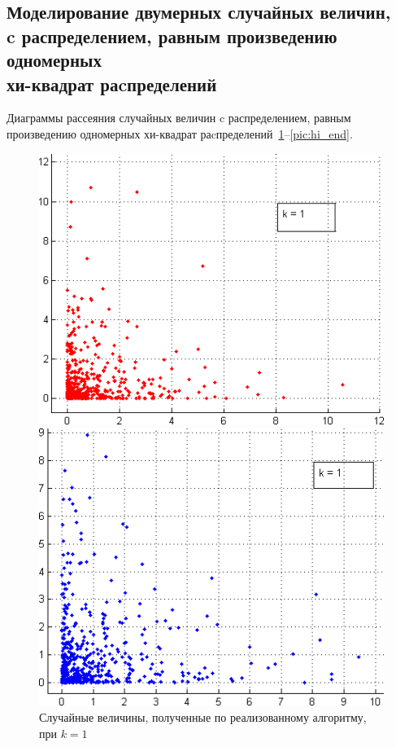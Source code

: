 \newpage 

\subsection{Моделирование двумерных случайных величин, \\ 
  c распределением, равным произведению одномерных \\
  хи-квадрат раcпределений}

Диаграммы рассеяния случайных величин c распределением, 
равным произведению одномерных хи-квадрат раcпределений~\ref{pic:hi_start}--\ref{pic:hi_end}.

\begin{figure}[h!]
  \begin{minipage}[h!]{0.47\linewidth}
    \includegraphics[width=1\linewidth]{pic/hi_our_1}
    \caption{Случайные величины, полученные по реализованному алгоритму,
      при $ k = 1 $
  }
    \label{pic:hi_start}
  \end{minipage}
  \hfill
  \begin{minipage}[h!]{0.47\linewidth}
    \vspace{4mm}
    \includegraphics[width=1\linewidth]{pic/hi_matlab_1}

\end{minipage}
\end{figure}
